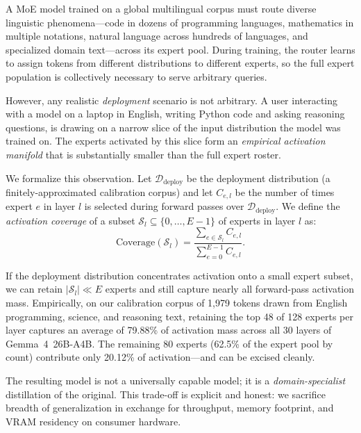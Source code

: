 \documentclass[final]{article}
\begin{document}
A MoE model trained on a global multilingual corpus must route diverse linguistic phenomena---code in dozens of programming languages, mathematics in multiple notations, natural language across hundreds of languages, and specialized domain text---across its expert pool. During training, the router learns to assign tokens from different distributions to different experts, so the full expert population is collectively necessary to serve arbitrary queries.

However, any realistic \emph{deployment} scenario is not arbitrary. A user interacting with a model on a laptop in English, writing Python code and asking reasoning questions, is drawing on a narrow slice of the input distribution the model was trained on. The experts activated by this slice form an \emph{empirical activation manifold} that is substantially smaller than the full expert roster.

We formalize this observation. Let $\mathcal{D}_\text{deploy}$ be the deployment distribution (a finitely-approximated calibration corpus) and let $C_{e,l}$ be the number of times expert $e$ in layer $l$ is selected during forward passes over $\mathcal{D}_\text{deploy}$. We define the \emph{activation coverage} of a subset $\mathcal{S}_l \subseteq \{0, \ldots, E-1\}$ of experts in layer $l$ as:
\begin{equation}
  \text{Coverage}(\mathcal{S}_l) = \frac{\sum_{e \in \mathcal{S}_l} C_{e,l}}{\sum_{e=0}^{E-1} C_{e,l}}.
  \label{eq:coverage}
\end{equation}

If the deployment distribution concentrates activation onto a small expert subset, we can retain $|\mathcal{S}_l| \ll E$ experts and still capture nearly all forward-pass activation mass. Empirically, on our calibration corpus of 1,979 tokens drawn from English programming, science, and reasoning text, retaining the top 48 of 128 experts per layer captures an average of 79.88\% of activation mass across all 30 layers of Gemma~4~26B-A4B. The remaining 80 experts (62.5\% of the expert pool by count) contribute only 20.12\% of activation---and can be excised cleanly.

The resulting model is not a universally capable model; it is a \emph{domain-specialist} distillation of the original. This trade-off is explicit and honest: we sacrifice breadth of generalization in exchange for throughput, memory footprint, and VRAM residency on consumer hardware.

\end{document}
